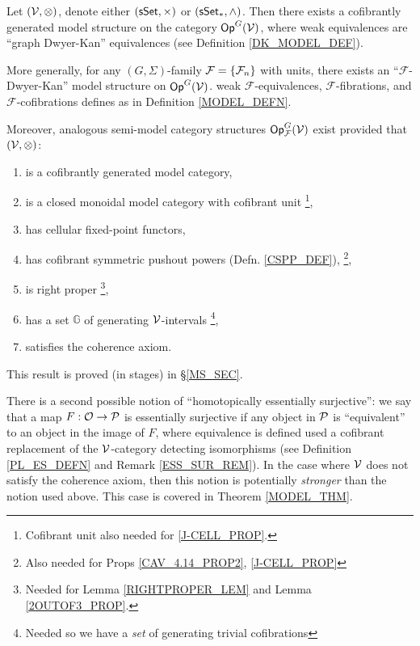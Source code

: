 \documentclass[a4paper,10pt
,draft
]{article}%
\renewcommand{\F}{\mathcal F}
\renewcommand{\1}{\eta}%
\begin{document}
\begin{theorem}
      \label{INTRO_MODEL_THM}
      Let $(\V, \otimes)$, denote either $(\sSet, \times)$ or $(\sSet_{\**}, \wedge)$.
      Then there exists a cofibrantly generated model structure on the category $\Op^G(\V)$,
      where weak equivalences are ``graph Dwyer-Kan'' equivalences (see Definition \ref{DK_MODEL_DEF}). 

      More generally, for any $(G, \Sigma)$-family $\F = \set{\F_n}$ with units,
      there exists an ``$\F$-Dwyer-Kan'' model structure on $\Op^G(\V)$.
      weak $\F$-equivalences, $\F$-fibrations, and $\F$-cofibrations defines as in Definition \ref{MODEL_DEFN}.
           
      Moreover, analogous semi-model category structures $\Op^G_\F(\V)$ exist
      provided that $(\V, \otimes)$:
      \begin{enumerate}[label = (\roman*)]\itemsep-4pt
      \item is a cofibrantly generated model category,
      \item is a closed monoidal model category with cofibrant unit
            \footnote{Cofibrant unit also needed for \ref{J-CELL_PROP}.},
      \item has cellular fixed-point functors,
      \item \label{I_CSPP_LBL} has cofibrant symmetric pushout powers  (Defn. \ref{CSPP_DEF}),
            \footnote{Also needed for Props \ref{CAV_4.14_PROP2}, \ref{J-CELL_PROP}}, %
      \item \label{I_RP_LBL} is right proper
            \footnote{Needed for Lemma \ref{RIGHTPROPER_LEM} and Lemma \ref{2OUTOF3_PROP}.},
      \item \label{I_GENSET_LBL} has a set $\mathbb{G}$ of generating $\V$-intervals
            \footnote{Needed so we have a \textit{set} of generating trivial cofibrations},
      \item satisfies the coherence axiom.
      \end{enumerate}
\end{theorem}

This result is proved (in stages) in \S \ref{MS_SEC}.

There is a second possible notion of ``homotopically essentially surjective'':
we say that a map $F: \O \to \P$ is essentially surjective if any object in $\P$ is ``equivalent'' to an object in the image of $F$,
where equivalence is defined used a cofibrant replacement of the $\V$-category detecting isomorphisms (see Definition \ref{PL_ES_DEFN} and Remark \ref{ESS_SUR_REM}).
In the case where $\V$ does not satisfy the coherence axiom, then this notion is potentially \textit{stronger} than the notion used above.
This case is covered in Theorem \ref{MODEL_THM}.
\end{document}
